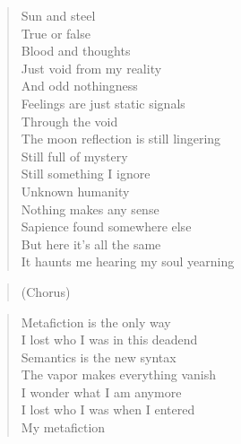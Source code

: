 \begin{minipage}{0.5\textwidth}

    \begin{verse}
    Sun and steel \\
	True or false  \\
	Blood and thoughts \\
	Just void from my reality \\
	And odd nothingness \\
	Feelings are just static signals \\
	Through the void \\
	The moon reflection is still lingering \\
	Still full of mystery \\
	Still something I ignore \\
	Unknown humanity \\
	Nothing makes any sense \\
	Sapience found somewhere else \\
	But here it's all the same \\
	It haunts me hearing my soul yearning
    \end{verse}

    \begin{verse}
    (Chorus)
    \end{verse}

    \begin{verse}
    Metafiction is the only way \\
	I lost who I was in this deadend \\
	Semantics is the new syntax \\
	The vapor makes everything vanish \\
	I wonder what I am anymore \\
	I lost who I was when I entered \\
	My metafiction
    \end{verse}

\end{minipage}
\clearpage
